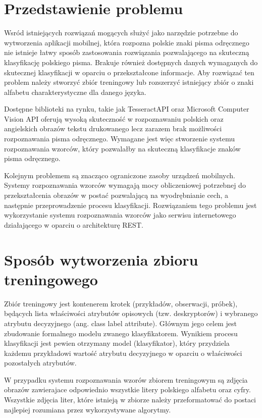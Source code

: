\documentclass[brudnopis]{xmgr}
\begin{document}
\section{Przedstawienie problemu}

Wsród istniejących rozwiązań mogących służyć jako narzędzie potrzebne do wytworzenia aplikacji mobilnej, która rozpozna polskie znaki pisma odręcznego nie istnieje łatwy sposób zastosowania rozwiązania pozwalającego na skuteczną klasyfikację polskiego pisma. Brakuje również dostępnych danych wymaganych do skutecznej klasyfikacji w oparciu o przekształcone informacje. Aby rozwiązać ten problem należy stworzyć zbiór treningowy lub rozszerzyć istniejący zbiór o znaki alfabetu charakterystyczne dla danego języka.

Dostępne biblioteki na rynku, takie jak TesseractAPI\cite{10} oraz Microsoft Computer Vision API\cite{9} oferują wysoką skuteczność w rozpoznawaniu polskich oraz angielskich obrazów tekstu drukowanego lecz zarazem brak możliwości rozpoznawania pisma odręcznego. Wymagane jest więc stworzenie systemu rozpoznawania wzorców, który pozwalałby na skuteczną klasyfikacje znaków pisma odręcznego.

Kolejnym problemem są znacząco ograniczone zasoby urządzeń mobilnych. Systemy rozpoznawania wzorców wymagają mocy obliczeniowej potrzebnej do przekształcenia obrazów w postać pozwalającą na wyodrębnianie cech, a następnie przeprowadzenie procesu klasyfikacji. Rozwiązaniem tego problemu jest wykorzystanie systemu rozpoznawania wzorców jako serwisu internetowego działającego w oparciu o architekturę REST\cite{5}.

\section{Sposób wytworzenia zbioru treningowego}

Zbiór treningowy\cite{19} jest kontenerem krotek (przykładów, obserwacji, próbek), będących lista właściwości atrybutów opisowych (tzw. deskryptorów) i wybranego atrybutu decyzyjnego (ang. class label attribute). Głównym jego celem jest zbudowanie formalnego modelu zwanego klasyfikatorem. Wynikiem procesu klasyfikacji jest pewien otrzymany model (klasyfikator), który przydziela każdemu przykładowi wartość atrybutu decyzyjnego w oparciu o właściwości pozostałych atrybutów.

W przypadku systemu rozpoznawania wzorów zbiorem treningowym są zdjęcia obrazów zawierajace odpowiednio wszystkie litery polskiego alfabetu oraz cyfry. Wszystkie zdjęcia liter, które istnieją w zbiorze należy przeformatować do postaci najlepiej rozumiana przez wykorzystywane algorytmy.
\end{document}
